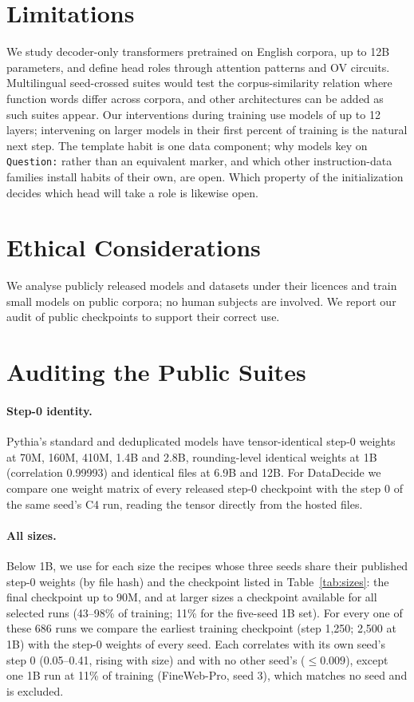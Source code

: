 \documentclass[11pt]{article}
\newcommand{\tmpl}[1]{\texttt{#1}}
\begin{document}
\section*{Limitations}
We study decoder-only transformers pretrained on English corpora, up to 12B parameters, and define head roles through attention patterns and OV circuits.
Multilingual seed-crossed suites would test the corpus-similarity relation where function words differ across corpora, and other architectures can be added as such suites appear.
Our interventions during training use models of up to 12 layers; intervening on larger models in their first percent of training is the natural next step.
The template habit is one data component; why models key on \tmpl{Question:} rather than an equivalent marker, and which other instruction-data families install habits of their own, are open.
Which property of the initialization decides which head will take a role is likewise open.

\section*{Ethical Considerations}
We analyse publicly released models and datasets under their licences and train small models on public corpora; no human subjects are involved.
We report our audit of public checkpoints to support their correct use.



\appendix

\section{Auditing the Public Suites}
\label{app:audit}



\paragraph{Step-0 identity.}
Pythia's standard and deduplicated models have tensor-identical step-0 weights at 70M, 160M, 410M, 1.4B and 2.8B, rounding-level identical weights at 1B (correlation 0.99993) and identical files at 6.9B and 12B.
For DataDecide we compare one weight matrix of every released step-0 checkpoint with the step 0 of the same seed's C4 run, reading the tensor directly from the hosted files.

\paragraph{All sizes.}
Below 1B, we use for each size the recipes whose three seeds share their published step-0 weights (by file hash) and the checkpoint listed in Table~\ref{tab:sizes}: the final checkpoint up to 90M, and at larger sizes a checkpoint available for all selected runs (43--98\% of training; 11\% for the five-seed 1B set).
For every one of these 686 runs we compare the earliest training checkpoint (step 1{,}250; 2{,}500 at 1B) with the step-0 weights of every seed.
Each correlates with its own seed's step 0 (0.05--0.41, rising with size) and with no other seed's ($\le 0.009$), except one 1B run at 11\% of training (FineWeb-Pro, seed 3), which matches no seed and is excluded.
\end{document}
